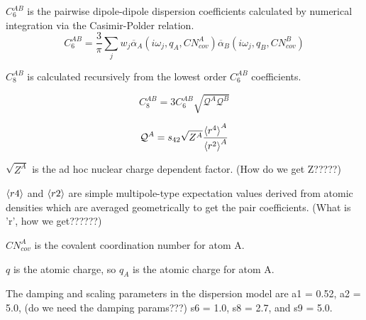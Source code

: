 \documentclass{article}
\begin{document}
\(C_6^{AB}\) is the pairwise dipole-dipole dispersion coefficients calculated by numerical integration via the Casimir-Polder relation.
\begin{equation}
  C_6^{AB} = \frac{3}{\pi} \sum_{j} w_j \overline{\alpha}_A (i\omega_j, q_A, CN_{cov}^A)\overline{\alpha}_B (i\omega_j, q_B, CN_{cov}^B)
\end{equation}

\(C_8^{AB}\) is calculated recursively from the lowest order \(C_6^{AB}\) coefficients.

\begin{equation}
  C_8^{AB} = 3C_6^{AB} \sqrt{\mathcal{Q}^A\mathcal{Q}^B}
\end{equation}

\begin{equation}
  \mathcal{Q}^A = s_{42} \sqrt{Z^A} \frac{\braket{r^4}^A}{\braket{r^2}^A}
\end{equation}

\(\sqrt{Z^A}\) is the ad hoc nuclear charge dependent factor. (How do we get Z?????)

\(\braket{r4}\) and \(\braket{r2}\) are simple multipole-type expectation values derived from atomic densities which are averaged geometrically to get the pair coefficients. (What is 'r', how we get??????)


\(CN^A_{cov}\) is the covalent coordination number for atom A.

\(q\) is the atomic charge, so \(q_A\) is the atomic charge for atom A.

The damping and scaling parameters in the
dispersion model are a1 = 0.52, a2 = 5.0, (do we need the damping params???) s6 = 1.0, s8 = 2.7, and s9 = 5.0.
\end{document}
